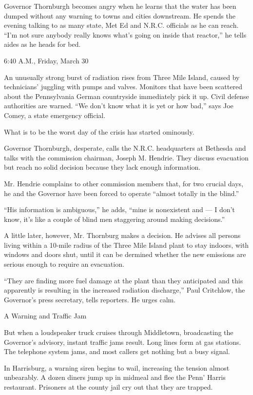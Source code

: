 Governor Thornburgh becomes angry when he learns that the water has been
dumped without any warning to towns and cities downstream. He spends the
evening talking to as many state, Met Ed and N.R.C. officials as he can
reach. ``I'm not sure anybody really knows what's going on inside that
reactor,'' he tells aides as he heads for bed.

6:40 A.M., Friday, March 30

An unusually strong burst of radiation rises from Three Mile Island,
caused by technicians' juggling with pumps and valves. Monitors that
have been scattered about the Pennsylvania German countryside
immediately pick it up. Civil defense authorities are warned. ``We don't
know what it is yet or how bad,'' says Joe Comey, a state emergency
official.

What is to be the worst day of the crisis has started ominously.

Governor Thornburgh, desperate, calls the N.R.C. headquarters at
Bethesda and talks with the commission chairman, Joseph M. Hendrie. They
discuss evacuation but reach no solid decision because they lack enough
information.

Mr. Hendrie complains to other commission members that, for two crucial
days, he and the Governor have been forced to operate ``almost totally
in the blind.''

``His information is ambiguous,'' he adds, ``mine is nonexistent and ---
I don't know, it's like a couple of blind men staggering around making
decisions.''

A little later, however, Mr. Thornburg makes a decision. He advises all
persons living within a 10‐mile radius of the Three Mile Island plant to
stay indoors, with windows and doors shut, until it can be dermined
whether the new emissions are serious enough to require an evacuation.

``They are finding more fuel damage at the plant than they anticipated
and this apparently is resulting in the increased radiation discharge,''
Paul Critchlow, the Governor's press secretary, tells reporters. He
urges calm.

A Warning and Traffic Jam

But when a loudspeaker truck cruises through Middletown, broadcasting
the Governor's advisory, instant traffic jams result. Long lines form at
gas stations. The telephone system jams, and most callers get nothing
but a busy signal.

In Harrisburg, a warning siren begins to wail, increasing the tension
almost unbearably. A dozen diners jump up in midmeal and flee the Penn'
Harris restaurant. Prisoners at the county jail cry out that they are
trapped.

